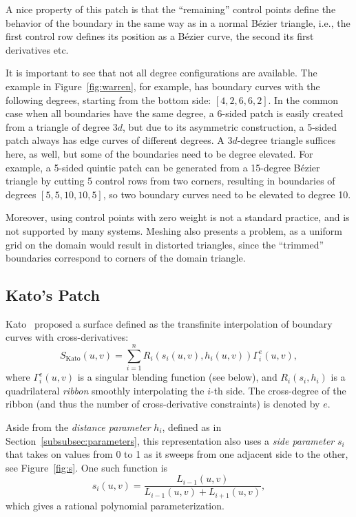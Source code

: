 \documentclass[9pt,academicons]{article}
\begin{document}
A nice property of this patch is that the ``remaining'' control points define the behavior of the
boundary in the same way as in a normal B\'ezier triangle, i.e., the first control row defines
its position as a B\'ezier curve, the second its first derivatives etc.

It is important to see that not all degree configurations are available.
The example in Figure~\ref{fig:warren}, for example, has boundary curves with the
following degrees, starting from the bottom side: $[4,2,6,6,2]$. In the common case
when all boundaries have the same degree, a 6-sided patch is easily created from 
a triangle of degree $3d$, but due to its asymmetric construction,
a 5-sided patch always has edge curves of different degrees.
A $3d$-degree triangle suffices here, as well, but some of the boundaries need to be
degree elevated. For example, a 5-sided quintic patch can be generated from a 15-degree
B\'ezier triangle by cutting 5 control rows from two corners, resulting in boundaries of
degrees $[5,5,10,10,5]$, so two boundary curves need to be elevated to degree 10.

Moreover, using control points with zero
weight is not a standard practice, and is not supported by many systems. Meshing
also presents a problem, as a uniform grid on the domain would result in distorted triangles,
since the ``trimmed'' boundaries correspond to corners of the domain triangle.

\subsection{Kato's Patch}
\label{subsec:kato}
Kato~\cite{Kato:1991} proposed a surface defined as the transfinite interpolation of boundary
curves with cross-derivatives:
\begin{equation}
  S_\mathrm{Kato}(u,v)=\sum_{i=1}^nR_i(s_i(u,v),h_i(u,v))\Gamma_i^{e}(u,v),
\end{equation}
where $\Gamma_i^{e}(u,v)$ is a singular blending function (see below), and
$R_i(s_i,h_i)$ is a quadrilateral \emph{ribbon} smoothly interpolating the $i$-th side.
The cross-degree of the ribbon
(and thus the number of cross-derivative constraints) is denoted by $e$.

Aside from the \emph{distance parameter} $h_i$, defined as in Section~\ref{subsubsec:parameters},
this representation also uses a \emph{side parameter} $s_i$
that takes on values from 0 to 1 as it sweeps from one adjacent side to the other,
see Figure~\ref{fig:s}.
One such function is
\begin{equation}
  s_i(u,v)=\frac{L_{i-1}(u,v)}{L_{i-1}(u,v)+L_{i+1}(u,v)},
\end{equation}
which gives a rational polynomial parameterization.
\end{document}

